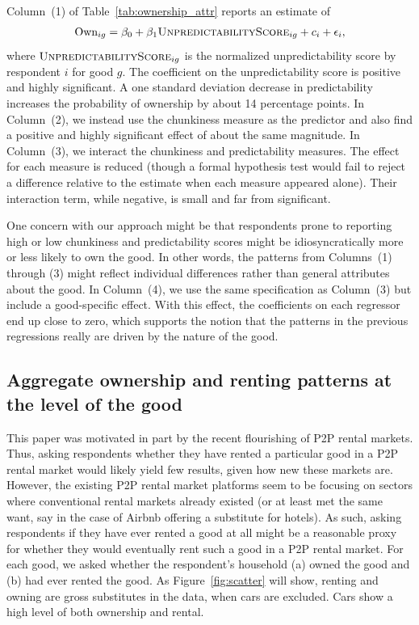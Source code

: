 \documentclass[11pt]{article}
\begin{document}
Column~(1) of Table~\ref{tab:ownership_attr} reports an estimate of 
\begin{align}
  \text{Own}_{ig} = \beta_0 + \beta_1 \textsc{UnpredictabilityScore}_{ig} + c_i + \epsilon_i,
\end{align} 
where $\textsc{UnpredictabilityScore}_{ig}$ is the normalized unpredictability score by respondent $i$ for good $g$.
The coefficient on the unpredictability score is positive and highly significant.
A one standard deviation decrease in predictability increases the probability of ownership by about 14 percentage points. 
In Column~(2), we instead use the chunkiness measure as the predictor and also find a positive and highly significant effect of about the same magnitude. 
In Column~(3), we interact the chunkiness and predictability measures.
The effect for each measure is reduced (though a formal hypothesis test would fail to reject a difference relative to the estimate when each measure appeared alone).
Their interaction term, while negative, is small and far from significant.

One concern with our approach might be that respondents prone to reporting high or low chunkiness and predictability scores might be idiosyncratically more or less likely to own the good.
In other words, the patterns from Columns~(1) through (3) might reflect individual differences rather than general attributes about the good.
In Column~(4), we use the same specification as Column~(3) but include a good-specific effect.
With this effect, the coefficients on each regressor end up close to zero, which supports the notion that the patterns in the previous regressions really are driven by the nature of the good. 

\subsection{Aggregate ownership and renting patterns at the level of the good}

This paper was motivated in part by the recent flourishing of P2P rental markets. 
Thus, asking respondents whether they have rented a particular good in a P2P rental market would likely yield few results, given how new these markets are.
However, the existing P2P rental market platforms seem to be focusing on sectors where conventional rental markets already existed (or at least met the same want, say in the case of Airbnb offering a substitute for hotels).
As such, asking respondents if they have ever rented a good at all might be a reasonable proxy for whether they would eventually rent such a good in a P2P rental market. 
For each good, we asked whether the respondent's household (a) owned the good and (b) had ever rented the good.
As Figure~\ref{fig:scatter} will show, renting and owning are gross substitutes in the data, when cars are excluded.
Cars show a high level of both ownership and rental. 
\end{document}
